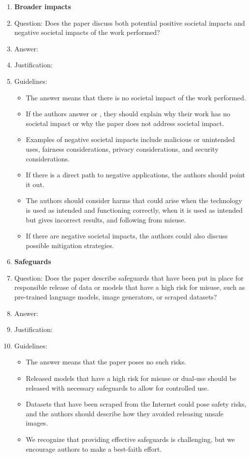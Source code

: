 \begin{enumerate}
\item {\bf Broader impacts}
    \item[] Question: Does the paper discuss both potential positive societal impacts and negative societal impacts of the work performed?
    \item[] Answer: \answerTODO{}
    \item[] Justification: \justificationTODO{}
    \item[] Guidelines:
    \begin{itemize}
        \item The answer \answerNA{} means that there is no societal impact of the work performed.
        \item If the authors answer \answerNA{} or \answerNo{}, they should explain why their work has no societal impact or why the paper does not address societal impact.
        \item Examples of negative societal impacts include malicious or unintended uses, fairness considerations, privacy considerations, and security considerations.
        \item If there is a direct path to negative applications, the authors should point it out.
        \item The authors should consider harms that could arise when the technology is used as intended and functioning correctly, when it is used as intended but gives incorrect results, and following from misuse.
        \item If there are negative societal impacts, the authors could also discuss possible mitigation strategies.
    \end{itemize}

\item {\bf Safeguards}
    \item[] Question: Does the paper describe safeguards that have been put in place for responsible release of data or models that have a high risk for misuse, such as pre-trained language models, image generators, or scraped datasets?
    \item[] Answer: \answerTODO{}
    \item[] Justification: \justificationTODO{}
    \item[] Guidelines:
    \begin{itemize}
        \item The answer \answerNA{} means that the paper poses no such risks.
        \item Released models that have a high risk for misuse or dual-use should be released with necessary safeguards to allow for controlled use.
        \item Datasets that have been scraped from the Internet could pose safety risks, and the authors should describe how they avoided releasing unsafe images.
        \item We recognize that providing effective safeguards is challenging, but we encourage authors to make a best-faith effort.
    \end{itemize}


\end{enumerate}
